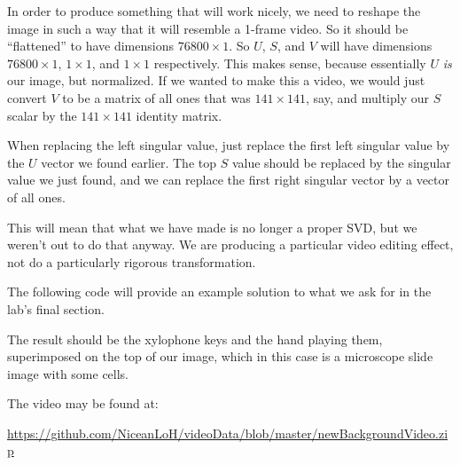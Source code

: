 In order to produce something that will work nicely, we need to reshape the image in such a way that it will resemble a 1-frame video. So it should be ``flattened'' to have dimensions $76800 \times 1$. So $U$, $S$, and $V$ will have dimensions $76800 \times 1$, $1 \times 1$, and $1 \times 1$ respectively. This makes sense, because essentially $U$ \textit{is} our image, but normalized. If we wanted to make this a video, we would just convert $V$ to be a matrix of all ones that was $141 \times 141$, say, and multiply our $S$ scalar by the $141 \times 141$ identity matrix.

When replacing the left singular value, just replace the first left singular value by the $U$ vector we found earlier. The top $S$ value should be replaced by the singular value we just found, and we can replace the first right singular vector by a vector of all ones.

This will mean that what we have made is no longer a proper SVD, but we weren't out to do that anyway. We are producing a particular video editing effect, not do a particularly rigorous transformation.

The following code will provide an example solution to what we ask for in the lab's final section.


The result should be the xylophone keys and the hand playing them, superimposed on the top of our image, which in this case is a microscope slide image with some cells.

The video may be found at:

\url{https://github.com/NiceanLoH/videoData/blob/master/newBackgroundVideo.zip}